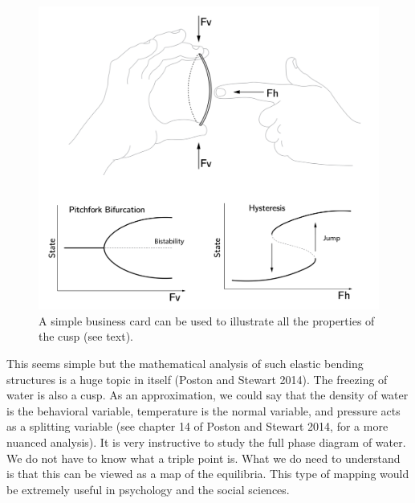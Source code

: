\documentclass[
  a4paper,
  DIV=11,
  numbers=noendperiod]{scrreprt}
\begin{document}
\begin{figure}

{\centering \includegraphics{media/ch3/ch3-11__figure23.png}

}

\caption{\label{fig-ch3-img11-old-23}A simple business card can be used
to illustrate all the properties of the cusp (see text).}

\end{figure}

This seems simple but the mathematical analysis of such elastic bending
structures is a huge topic in itself (Poston and Stewart 2014). The
freezing of water is also a cusp. As an approximation, we could say that
the density of water is the behavioral variable, temperature is the
normal variable, and pressure acts as a splitting variable (see chapter
14 of Poston and Stewart 2014, for a more nuanced analysis). It is very
instructive to study the full phase diagram of water. We do not have to
know what a triple point is. What we do need to understand is that this
can be viewed as a map of the equilibria. This type of mapping would be
extremely useful in psychology and the social sciences.
\end{document}
